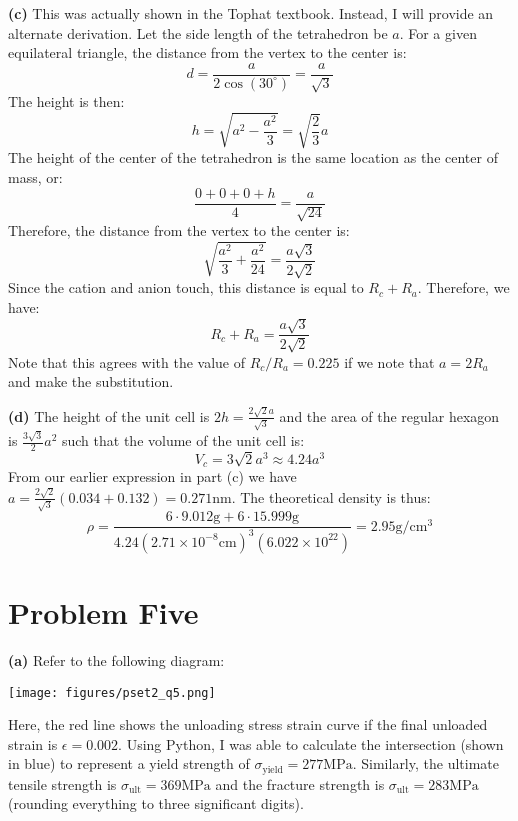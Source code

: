 \documentclass{article}
\begin{document}
    \textbf{(c)} This was actually shown in the Tophat textbook. Instead, I will provide an alternate derivation. Let the side length of the tetrahedron be $a$. For a given equilateral triangle, the distance from the vertex to the center is:
    \begin{equation}
        d = \frac{a}{2\cos(30^\circ)} = \frac{a}{\sqrt{3}}
    \end{equation}
    The height is then:
    \begin{equation}
        h = \sqrt{a^2-\frac{a^2}{3}} = \sqrt{\frac{2}{3}}a
    \end{equation}
    The height of the center of the tetrahedron is the same location as the center of mass, or:
    \begin{equation}
        \frac{0+0+0+h}{4}=\frac{a}{\sqrt{24}}
    \end{equation}
    Therefore, the distance from the vertex to the center is:
    \begin{equation}
        \sqrt{\frac{a^2}{3} + \frac{a^2}{24}} = \frac{a\sqrt{3}}{2\sqrt{2}}
    \end{equation}
    Since the cation and anion touch, this distance is equal to $R_c+R_a$. Therefore, we have:
    \begin{equation}
        R_c + R_a = \frac{a\sqrt{3}}{2\sqrt{2}}
    \end{equation}
    Note that this agrees with the value of $R_c/R_a = 0.225$ if we note that $a=2R_a$ and make the substitution.

    \textbf{(d)} The height of the unit cell is $2h=\frac{2\sqrt{2}a}{\sqrt{3}}$ and the area of the regular hexagon is $\frac{3\sqrt{3}}{2}a^2$ such that the volume of the unit cell is:
    \begin{equation}
        V_c = 3\sqrt{2}a^3 \approx 4.24a^3
    \end{equation}
    From our earlier expression in part (c) we have $a=\frac{2\sqrt{2}}{\sqrt{3}}(0.034+0.132)=0.271\si{\nano\meter}$. The theoretical density is thus:
    \begin{equation}
        \rho = \frac{6\cdot 9.012 \si{\gram} + 6 \cdot 15.999 \si{\gram}}{4.24(2.71 \times 10^{-8} \si{\centi\meter})^3 (6.022 \times 10^{22})} = \boxed{2.95 \si{\gram\per\centi\meter\cubed}}
    \end{equation}
    \section*{Problem Five}
    \textbf{(a)} Refer to the following diagram:
    \begin{center}
        \texttt{[image: figures/pset2\_q5.png]}
    \end{center}
    Here, the red line shows the unloading stress strain curve if the final unloaded strain is $\epsilon=0.002$. Using Python, I was able to calculate the intersection (shown in blue) to represent a yield strength of $\sigma_\text{yield}=277 \si{\mega\pascal}$. Similarly, the ultimate tensile strength is $\sigma_\text{ult} = 369\si{\mega\pascal}$ and the fracture strength is $\sigma_\text{ult} = 283\si{\mega\pascal}$ (rounding everything to three significant digits).
\end{document}

